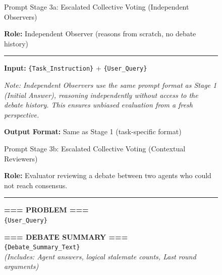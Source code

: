 \documentclass[11pt]{article}
\begin{document}
\begin{figure}[t]
    \centering
    \begin{promptbox}{Prompt Stage 3a: Escalated Collective Voting (Independent Observers)}
        \footnotesize
        \setlength{\parskip}{2pt}
        \setlength{\parindent}{0pt}

        \textbf{Role:} Independent Observer (reasons from scratch, no debate history)

        \vspace{3pt}\hrule\vspace{3pt}

        \textbf{Input:} \texttt{\{{Task\_Instruction\}}} + \texttt{\{{User\_Query\}}}

        \vspace{2pt}

        \textit{Note: Independent Observers use the same prompt format as Stage 1 (Initial Answer),
        reasoning independently without access to the debate history. This ensures unbiased evaluation
        from a fresh perspective.}

        \vspace{2pt}

        \textbf{Output Format:} Same as Stage 1 (task-specific format)
    \end{promptbox}

    \begin{promptbox}{Prompt Stage 3b: Escalated Collective Voting (Contextual Reviewers)}
        \footnotesize
        \setlength{\parskip}{2pt}
        \setlength{\parindent}{0pt}

        \textbf{Role:} Evaluator reviewing a debate between two agents who could not reach consensus.

        \vspace{3pt}\hrule\vspace{3pt}

        \textbf{=== PROBLEM ===} \\
        \texttt{\{{User\_Query\}}}

        \vspace{2pt}

        \textbf{=== DEBATE SUMMARY ===} \\
        \texttt{\{{Debate\_Summary\_Text\}}} \\
        \textit{(Includes: Agent answers, logical stalemate counts, Last round arguments)}


\end{promptbox}
\end{figure}
\end{document}
